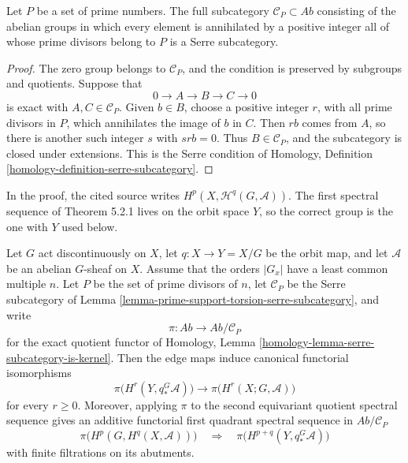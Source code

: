 \begin{lemma}
\label{lemma-prime-support-torsion-serre-subcategory}
Let $P$ be a set of prime numbers. The full subcategory
$\mathcal{C}_P\subset\textit{Ab}$ consisting of the abelian groups in which
every element is annihilated by a positive integer all of whose prime
divisors belong to $P$ is a Serre subcategory.
\end{lemma}

\begin{proof}
The zero group belongs to $\mathcal{C}_P$, and the condition is preserved by
subgroups and quotients. Suppose that
$$
0\longrightarrow A\longrightarrow B\longrightarrow C\longrightarrow0
$$
is exact with $A,C\in\mathcal{C}_P$. Given $b\in B$, choose a positive
integer $r$, with all prime divisors in $P$, which annihilates the image of
$b$ in $C$. Then $rb$ comes from $A$, so there is another such integer $s$
with $srb=0$. Thus $B\in\mathcal{C}_P$, and the subcategory is closed under
extensions. This is the Serre condition of Homology, Definition
\ref{homology-definition-serre-subcategory}.
\end{proof}

\begin{lemma}
\label{lemma-orbit-space-equivariant-cohomology-modulo-stabilizer-primes}
\begin{reference}
\cite[Chapter V, \S 5.3, Corollary 2, pp. 204--205]{Tohoku}
\end{reference}
\begin{history}
In the proof, the cited source writes
$H^p(X,\mathcal{H}^q(G,\mathcal{A}))$. The first spectral sequence of
Theorem 5.2.1 lives on the orbit space $Y$, so the correct group is the one
with $Y$ used below.
\end{history}
Let $G$ act discontinuously on $X$, let $q:X\to Y=X/G$ be the orbit map,
and let $\mathcal{A}$ be an abelian $G$-sheaf on $X$. Assume that the orders
$|G_x|$ have a least common multiple $n$. Let $P$ be the set of prime
divisors of $n$, let $\mathcal{C}_P$ be the Serre subcategory of Lemma
\ref{lemma-prime-support-torsion-serre-subcategory}, and write
$$
\pi:\textit{Ab}\longrightarrow\textit{Ab}/\mathcal{C}_P
$$
for the exact quotient functor of Homology, Lemma
\ref{homology-lemma-serre-subcategory-is-kernel}. Then the edge maps induce
canonical functorial isomorphisms
$$
\pi\bigl(H^r(Y,q_*^G\mathcal{A})\bigr)
\longrightarrow
\pi\bigl(H^r(X;G,\mathcal{A})\bigr)
$$
for every $r\geq0$. Moreover, applying $\pi$ to the second equivariant
quotient spectral sequence gives an additive functorial first quadrant
spectral sequence in $\textit{Ab}/\mathcal{C}_P$
$$
\pi\bigl(H^p(G,H^q(X,\mathcal{A}))\bigr)
\quad\Longrightarrow\quad
\pi\bigl(H^{p+q}(Y,q_*^G\mathcal{A})\bigr)
$$
with finite filtrations on its abutments.
\end{lemma}

